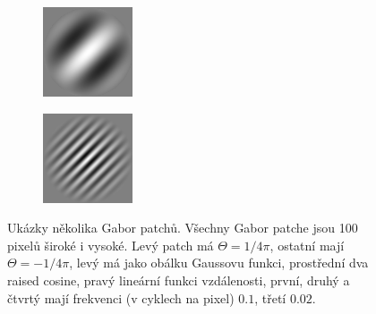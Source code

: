 \begin{figure}[h!]
\begin{subfigure}{0.25\textwidth}
\end{subfigure}%
\begin{subfigure}{0.25\textwidth}
  \centering
  \includegraphics[width=.8\linewidth]{img/gabor3}
\end{subfigure}%
\begin{subfigure}{0.25\textwidth}
  \centering
  \includegraphics[width=.8\linewidth]{img/gabor4}
\end{subfigure}%

\caption{Ukázky několika Gabor patchů. Všechny Gabor patche jsou 100 pixelů
široké i vysoké. Levý patch má $\Theta = 1/4\pi$, ostatní mají $\Theta =
-1/4\pi$, levý má jako obálku Gaussovu funkci, prostřední dva raised cosine,
pravý lineární funkci vzdálenosti, první, druhý a čtvrtý mají frekvenci (v
cyklech na pixel) $0.1$, třetí $0.02$.} 

\label{obr:gabor:example} 
 
\end{figure}

